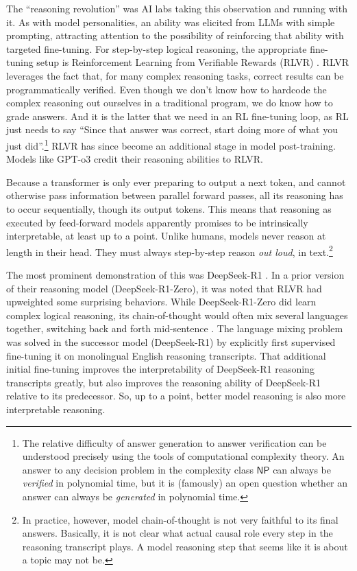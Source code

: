 The ``reasoning revolution'' was AI labs taking this observation and running
with it. As with model personalities, an ability was elicited from LLMs with
simple prompting, attracting attention to the possibility of reinforcing that
ability with targeted fine-tuning. For step-by-step logical reasoning, the
appropriate fine-tuning setup is Reinforcement Learning from Verifiable Rewards
(RLVR) \cite{lambert2025tulu}. RLVR leverages the fact that, for many complex
reasoning tasks, correct results can be programmatically verified. Even though
we don't know how to hardcode the complex reasoning out ourselves in a
traditional program, we do know how to grade answers. And it is the latter that
we need in an RL fine-tuning loop, as RL just needs to say ``Since that answer
was correct, start doing more of what you just did''.\footnote{The relative
difficulty of answer generation to answer verification can be understood
precisely using the tools of computational complexity theory. An answer to any
decision problem in the complexity class $\mathsf{NP}$ can always be
\emph{verified} in polynomial time, but it is (famously) an open question
whether an answer can always be \emph{generated} in polynomial time.} RLVR has
since become an additional stage in model post-training. Models like GPT-o3
credit their reasoning abilities to RLVR.

Because a transformer is only ever preparing to output a next token, and cannot
otherwise pass information between parallel forward passes, all its reasoning
has to occur sequentially, though its output tokens. This means that reasoning
as executed by feed-forward models apparently promises to be intrinsically
interpretable, at least up to a point. Unlike humans, models never reason at
length in their head. They must always step-by-step reason \emph{out loud}, in
text.\footnote{In practice, however, model chain-of-thought is not very
faithful to its final answers. Basically, it is not clear what actual causal
role every step in the reasoning transcript plays. A model reasoning step that
seems like it is about a topic may not be.}

The most prominent demonstration of this was DeepSeek-R1
\cite{deepseekai2025deepseek}. In a prior version of their reasoning model
(DeepSeek-R1-Zero), it was noted that RLVR had upweighted some surprising
behaviors. While DeepSeek-R1-Zero did learn complex logical reasoning, its
chain-of-thought would often mix several languages together, switching back and
forth mid-sentence \cite{deepseekai2025deepseek}. The language mixing problem
was solved in the successor model (DeepSeek-R1) by explicitly first supervised
fine-tuning it on monolingual English reasoning transcripts. That additional
initial fine-tuning improves the interpretability of DeepSeek-R1 reasoning
transcripts greatly, but also improves the reasoning ability of DeepSeek-R1
relative to its predecessor. So, up to a point, better model reasoning is also
more interpretable reasoning.

